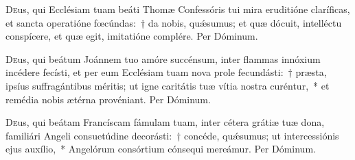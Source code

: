 \documentclass[vesperale_romanum.tex]{subfiles}
\begin{document}
\myrule


\duplex

\odoctoroptime

\oratio

\lettrine{D}{e}us, qui Ecclésiam tuam beáti Thomæ Confessóris tui mira eruditióne claríficas, et san\-cta operatióne fœcúndas:~† da nobis, quǽsumus; et quæ dócuit, intellé\-ctu conspícere, et quæ egit, imitatióne complére. Per Dóminum.


\capitdeseqquad

\myrule


\duplex

\oratio

\lettrine{D}{e}us, qui beátum Joánnem tuo amóre succénsum, inter flammas innóxium incédere fecísti, et per eum Ecclésiam tuam nova prole fecundásti:~† præsta, i\-psíus suffragántibus méritis; ut igne caritátis tuæ vítia nostra curéntur,~* et remédia nobis ætérna provéniant. Per Dóminum.


\myrule

\newpage


\duplex

\oratio

\lettrine{D}{e}us, qui beátam Francíscam fámulam tuam, inter cétera grátiæ tuæ dona, familiári Angeli consuetúdine decorásti:~† concéde, quǽsumus; ut intercessiónis ejus auxílio,~* Angelórum consórtium cónsequi mereámur.
Per Dóminum.


\end{document}
